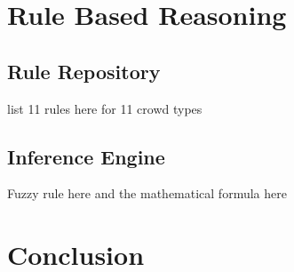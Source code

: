 \section{Rule Based Reasoning}

\subsection{Rule Repository}

list 11 rules here for 11 crowd types

\subsection{Inference Engine}

Fuzzy rule here and the mathematical formula here

\section{Conclusion}